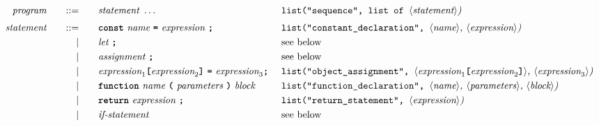 \begin{alignat*}{9}
&& \textit{program}    &&\quad ::= &\quad && \textit{statement} \ \ldots
                                                           && \texttt{list("sequence", list of  } \langle \textit{statement}\rangle \textit{)} \\[1mm]
&& \textit{statement}    &&\quad ::= &\quad && \textbf{\texttt{const}}\  \textit{name} \
                                           \textbf{\texttt{=}}\  \textit{expression} \ \textbf{\texttt{;}}
                                                           && \texttt{list("constant\_declaration",  } \langle \textit{name}\rangle \textit{,  } \langle \textit{expression}\rangle \textit{)} \\
&&                       && |   &\quad && \textit{let} \ \textbf{\texttt{;}}
                                                           &&  \textrm{see below}\\
&&                       && |   &\quad && \textit{assignment} \ \textbf{\texttt{;}}
                                                           && \textrm{see below}\\
&&                       && |   &\quad && \textit{expression}_1 \textbf{\texttt{[}}
                                          \textit{expression}_2 \textbf{\texttt{]}} \
                                           \textbf{\texttt{=}}\  \textit{expression}_3  \textbf{\texttt{;}}\
                                                           && \texttt{list("object\_assignment", } \langle \textit{expression}_1 \textbf{\texttt{[}} \textit{expression}_2 \textbf{\texttt{]}}  \rangle \textit{,  } \langle \textit{expression}_3\rangle \textit{)} \\
&&                       && |   &\quad && \textbf{\texttt{function}}\  \textit{name} \
                                   \textbf{\texttt{(}}\  \textit{parameters} \ \textbf{\texttt{)}}\ \textit{block} \quad
                                                           &&  \texttt{list("function\_declaration",  } \langle \textit{name}\rangle \textit{, } \langle \textit{parameters}\rangle \textit{,}\ \langle \textit{block}\rangle \textit{)} \\
&&                       && |   &\quad && \textbf{\texttt{return}}\  \textit{expression} \ \textbf{\texttt{;}}
                                                           && \texttt{list("return\_statement",  } \langle \textit{expression}\rangle \textit{)} \\
&&                       && |   &\quad && \textit{if-statement} \quad
                                                           && \textrm{see below}\\

\end{alignat*}
